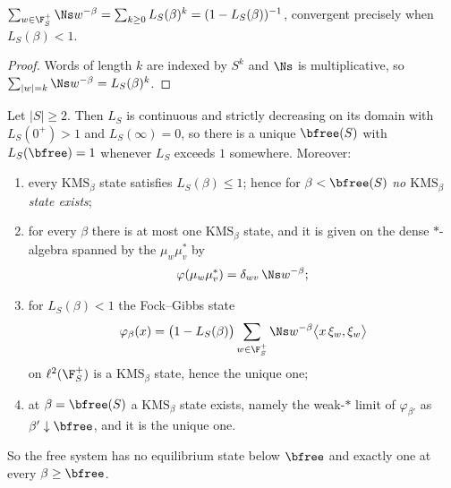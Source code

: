 \begin{proposition}\label{V:prop:Z}
$\sum_{w\in\F_S^+}\Ns w^{-\beta}=\sum_{k\ge0}L_S(\beta)^k=(1-L_S(\beta))^{-1}$, convergent
precisely when $L_S(\beta)<1$.
\end{proposition}

\begin{proof}
Words of length $k$ are indexed by $S^k$ and $\Ns$ is multiplicative, so
$\sum_{|w|=k}\Ns w^{-\beta}=L_S(\beta)^k$.
\end{proof}

\begin{theorem}\label{V:thm:betac}
Let $|S|\ge2$. Then $L_S$ is continuous and strictly decreasing on its domain with
$L_S(0^+)>1$ and $L_S(\infty)=0$, so there is a unique $\bfree(S)$ with $L_S(\bfree)=1$
whenever $L_S$ exceeds $1$ somewhere. Moreover:
\begin{enumerate}
\item every $\mathrm{KMS}_\beta$ state satisfies $L_S(\beta)\le1$; hence for
$\beta<\bfree(S)$ \emph{no $\mathrm{KMS}_\beta$ state exists};
\item for every $\beta$ there is at most one $\mathrm{KMS}_\beta$ state, and it is given
on the dense $*$-algebra spanned by the $\mu_w\mu_v^*$ by
\begin{equation}\label{V:eq:unique}
\varphi(\mu_w\mu_v^*)=\delta_{wv}\,\Ns w^{-\beta};
\end{equation}
\item for $L_S(\beta)<1$ the Fock--Gibbs state
\begin{equation}\label{V:eq:gibbs}
\varphi_\beta(x)=\bigl(1-L_S(\beta)\bigr)\sum_{w\in\F_S^+}\Ns w^{-\beta}\bigl\langle x\,\xi_w,\xi_w\bigr\rangle
\end{equation}
on $\ell^2(\F_S^+)$ is a $\mathrm{KMS}_\beta$ state, hence the unique one;
\item at $\beta=\bfree(S)$ a $\mathrm{KMS}_\beta$ state exists, namely the weak-$*$ limit of
$\varphi_{\beta'}$ as $\beta'\downarrow\bfree$, and it is the unique one.
\end{enumerate}
So the free system has no equilibrium state below $\bfree$ and exactly one at every
$\beta\ge\bfree$.
\end{theorem}


